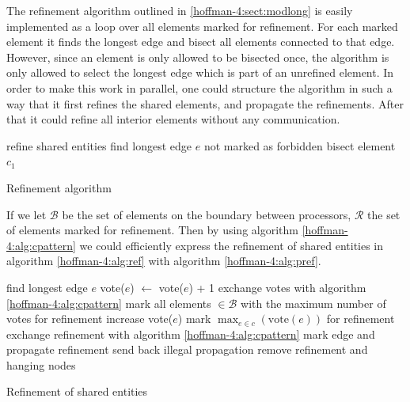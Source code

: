 The refinement algorithm outlined in \ref{hoffman-4:sect:modlong} is easily
implemented as a loop over all elements marked for refinement. For
each marked element it finds the longest edge and bisect all elements
connected to that edge. However, since an element is only allowed to
be bisected once, the algorithm is only allowed to select the longest
edge which is part of an unrefined element. In order to make this work
in parallel, one could structure the algorithm in such a way that it
first refines the shared elements, and propagate the refinements. After
that it could refine all interior elements without any communication.
\begin{algorithm}
  \begin{algorithmic}
    \State refine shared entities
    \State find longest edge $e$ not marked as forbidden
    \State bisect element $c_1$
    \EndFor
    \EndFor
  \end{algorithmic}
  \caption{Refinement algorithm}
  \label{hoffman-4:alg:ref}
\end{algorithm}

If we let $\mathcal{B}$ be the set of elements on the boundary between
processors, $\mathcal{R}$ the set of elements marked for
refinement. Then by using algorithm \ref{hoffman-4:alg:cpattern} we could
efficiently express the refinement of shared entities in algorithm
\ref{hoffman-4:alg:ref} with algorithm \ref{hoffman-4:alg:pref}.
\begin{algorithm}
  \begin{algorithmic}
    \State find longest edge $e$
    \State vote($e$) $\leftarrow$ vote($e$) + 1
    \EndIf
    \EndFor
    \State exchange votes with algorithm \ref{hoffman-4:alg:cpattern}
    \State mark all elements $\in \mathcal{B}$ with the maximum number of votes for refinement
     \State increase vote($e$) \EndFor
     \State mark $ \max_{e \in c}\left( \textrm{vote}(e) \right)$ for refinement \EndFor
    \State exchange refinement with algorithm \ref{hoffman-4:alg:cpattern}
    \State mark edge and propagate refinement
    \Else
    \State send back illegal propagation
    \EndIf
    \EndFor
    \State remove refinement and hanging nodes
    \EndFor
  \end{algorithmic}
  \caption{Refinement of shared entities}
  \label{hoffman-4:alg:pref}
\end{algorithm}



